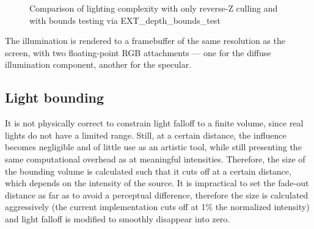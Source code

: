 
\begin{figure}[ht!]
  \centering
  \caption[Light volume culling comparison]{Comparison of lighting complexity with only reverse-Z culling and with bounds testing via EXT\_depth\_bounds\_test}
  \label{fig:lightingComplexityComparison}
\end{figure}

The illumination is rendered to a framebuffer of the same resolution as the screen, with two floating-point RGB attachments --- one for the diffuse illumination component, another for the specular.

\subsection{Light bounding}

It is not physically correct to constrain light falloff to a finite volume, since real lights do not have a limited range. Still, at a certain distance, the influence becomes negligible and of little use as an artistic tool, while still presenting the same computational overhead as at meaningful intensities. Therefore, the size of the bounding volume is calculated such that it cuts off at a certain distance, which depends on the intensity of the source. It is impractical to set the fade-out distance as far as to avoid a perceptual difference, therefore the size is calculated aggressively (the current implementation cuts off at 1\% the normalized intensity) and light falloff is modified to smoothly disappear into zero.


